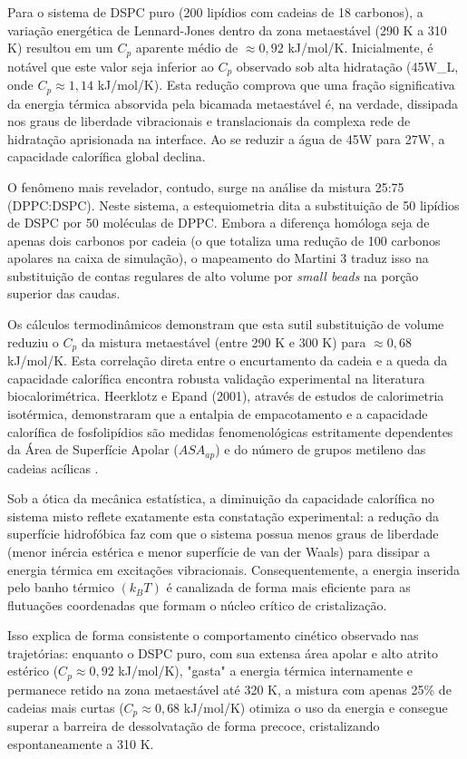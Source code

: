 \documentclass[12pt]{article} %
\begin{document}
Para o sistema de DSPC puro (200 lipídios com cadeias de 18 carbonos), a variação energética de Lennard-Jones dentro da zona metaestável (290 K a 310 K) resultou em um $C_p$ aparente médio de $\approx 0,92$ kJ/mol/K. Inicialmente, é notável que este valor seja inferior ao $C_p$ observado sob alta hidratação (45W\_L, onde $C_p \approx 1,14$ kJ/mol/K). Esta redução comprova que uma fração significativa da energia térmica absorvida pela bicamada metaestável é, na verdade, dissipada nos graus de liberdade vibracionais e translacionais da complexa rede de hidratação aprisionada na interface. Ao se reduzir a água de 45W para 27W, a capacidade calorífica global declina.

O fenômeno mais revelador, contudo, surge na análise da mistura 25:75 (DPPC:DSPC). Neste sistema, a estequiometria dita a substituição de 50 lipídios de DSPC por 50 moléculas de DPPC. Embora a diferença homóloga seja de apenas dois carbonos por cadeia (o que totaliza uma redução de 100 carbonos apolares na caixa de simulação), o mapeamento do Martini 3 traduz isso na substituição de contas regulares de alto volume por \textit{small beads} na porção superior das caudas.

Os cálculos termodinâmicos demonstram que esta sutil substituição de volume reduziu o $C_p$ da mistura metaestável (entre 290 K e 300 K) para $\approx 0,68$ kJ/mol/K. Esta correlação direta entre o encurtamento da cadeia e a queda da capacidade calorífica encontra robusta validação experimental na literatura biocalorimétrica. Heerklotz e Epand (2001), através de estudos de calorimetria isotérmica, demonstraram que a entalpia de empacotamento e a capacidade calorífica de fosfolipídios são medidas fenomenológicas estritamente dependentes da Área de Superfície Apolar ($ASA_{ap}$) e do número de grupos metileno das cadeias acílicas \cite{heerklotz2001}. 

Sob a ótica da mecânica estatística, a diminuição da capacidade calorífica no sistema misto reflete exatamente esta constatação experimental: a redução da superfície hidrofóbica faz com que o sistema possua menos graus de liberdade (menor inércia estérica e menor superfície de van der Waals) para dissipar a energia térmica em excitações vibracionais. Consequentemente, a energia inserida pelo banho térmico $(k_B T)$ é canalizada de forma mais eficiente para as flutuações coordenadas que formam o núcleo crítico de cristalização.

Isso explica de forma consistente o comportamento cinético observado nas trajetórias: enquanto o DSPC puro, com sua extensa área apolar e alto atrito estérico ($C_p \approx 0,92$ kJ/mol/K), "gasta" a energia térmica internamente e permanece retido na zona metaestável até 320 K, a mistura com apenas 25\% de cadeias mais curtas ($C_p \approx 0,68$ kJ/mol/K) otimiza o uso da energia e consegue superar a barreira de dessolvatação de forma precoce, cristalizando espontaneamente a 310 K.
\end{document}
